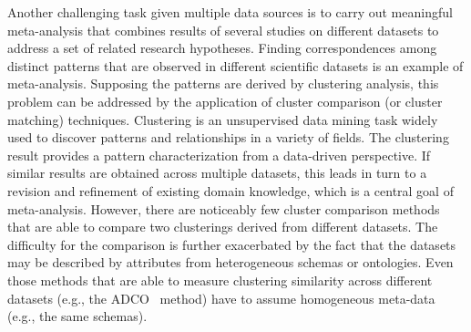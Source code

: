 Another challenging task given multiple data sources is to carry out meaningful meta-analysis that combines results of several studies on different datasets to address a set of related research hypotheses. Finding correspondences among distinct patterns that are observed in different scientific datasets is an example of meta-analysis. Supposing the patterns are derived by clustering analysis, this problem can be addressed by the application of cluster comparison (or cluster matching) techniques. Clustering is an unsupervised data mining task widely used to discover patterns and relationships in a variety of fields. The clustering result provides a pattern characterization from a data-driven perspective. If similar results are obtained across multiple datasets, this leads in turn to a revision and refinement of existing domain knowledge, which is a central goal of meta-analysis. However, there are noticeably few cluster comparison methods that are able to compare two clusterings derived from different datasets. The difficulty for the comparison is further exacerbated by the fact that the datasets may be described by attributes from heterogeneous schemas or ontologies. Even those methods that are able to measure clustering similarity across different datasets (e.g., the ADCO~\cite{Bae2010} method) have to assume homogeneous meta-data (e.g., the same schemas).

